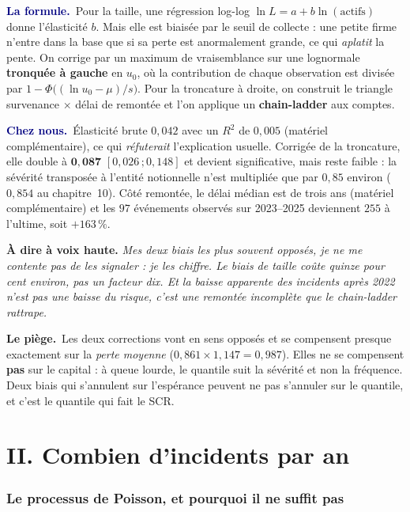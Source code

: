 \documentclass[11pt,a4paper]{article}
\newcommand{\laformule}[1]{\smallskip\noindent\textcolor{navy}{\textbf{La formule.}}\ #1\par}
\newcommand{\cheznous}[1]{\smallskip\noindent\textcolor{navy}{\textbf{Chez nous.}}\ #1\par}
\newcommand{\lepiege}[1]{\smallskip\noindent\textcolor{accent}{\textbf{Le piège.}}\ #1\par}
\newcommand{\laphrase}[1]{\begin{phrasebox}\textbf{À dire à voix haute.} \emph{#1}\end{phrasebox}}
\begin{document}
\laformule{Pour la taille, une régression log-log $\ln L = a + b\ln(\text{actifs})$ donne
l'élasticité $b$. Mais elle est biaisée par le seuil de collecte : une petite firme n'entre
dans la base que si sa perte est anormalement grande, ce qui \emph{aplatit} la pente. On
corrige par un maximum de vraisemblance sur une lognormale \textbf{tronquée à gauche} en $u_0$,
où la contribution de chaque observation est divisée par $1-\Phi\bigl((\ln u_0-\mu)/s\bigr)$.
Pour la troncature à droite, on construit le triangle survenance $\times$ délai de remontée et
l'on applique un \textbf{chain-ladder} aux comptes.}

\cheznous{Élasticité brute $0{,}042$ avec un $R^2$ de $0{,}005$ (matériel complémentaire), ce qui
\emph{réfuterait} l'explication usuelle. Corrigée de la troncature, elle double à
$\mathbf{0{,}087}$ $[0{,}026\,;0{,}148]$ et devient significative, mais reste faible : la sévérité
transposée à l'entité notionnelle n'est multipliée que par $0{,}85$ environ ($0{,}854$ au
chapitre~10). Côté remontée, le délai médian est de trois ans (matériel complémentaire) et les
$97$ événements observés sur 2023--2025 deviennent \textbf{$255$} à l'ultime, soit $+163\,\%$.}

\laphrase{Mes deux biais les plus souvent opposés, je ne me contente pas de les signaler : je
les chiffre. Le biais de taille coûte quinze pour cent environ, pas un facteur dix. Et la baisse
apparente des incidents après 2022 n'est pas une baisse du risque, c'est une remontée
incomplète que le chain-ladder rattrape.}

\lepiege{Les deux corrections vont en sens opposés et se compensent presque exactement sur la
\emph{perte moyenne} ($0{,}861\times1{,}147=0{,}987$). Elles ne se compensent \textbf{pas} sur
le capital : à queue lourde, le quantile suit la sévérité et non la fréquence. Deux biais qui
s'annulent sur l'espérance peuvent ne pas s'annuler sur le quantile, et c'est le quantile qui
fait le SCR.}

\part*{II. Combien d'incidents par an}

\section{Le processus de Poisson, et pourquoi il ne suffit pas}
\end{document}

